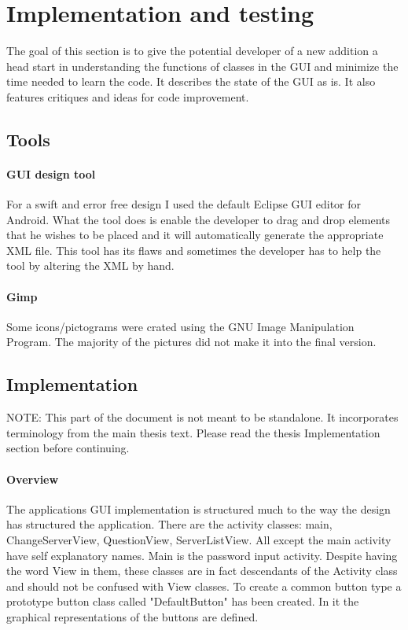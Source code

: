 \documentclass[11pt]{article} %
\begin{document}
\section{Implementation and testing}
The goal of this section is to give the potential developer of a new addition a head start in understanding the functions of classes in the GUI and minimize the time needed to learn the code. It describes the state of the GUI as is. It also features critiques and ideas for code improvement.
\subsection{Tools}
\paragraph{GUI design tool}
For a swift and error free design I used the default Eclipse GUI editor for Android. What the tool does is enable the developer to drag and drop elements that he wishes to be placed and it will automatically generate the appropriate XML file. This tool has its flaws and sometimes the developer has to help the tool by altering the XML by hand. 
\paragraph{Gimp}
Some icons/pictograms were crated using the GNU Image Manipulation Program. The majority of the pictures did not make it into the final version.
\subsection{Implementation}
NOTE: This part of the document is not meant to be standalone. It incorporates terminology from the main thesis text. Please read the thesis Implementation section before continuing.
\paragraph{Overview}
The applications GUI implementation is structured much to the way the design has structured the application. There are the activity classes: main, ChangeServerView, QuestionView, ServerListView. All except the main activity have self explanatory names. Main is the password input activity. Despite having the word View in them, these classes are in fact descendants of the Activity class and should not be confused with View classes. To create a common button type a prototype button class called "DefaultButton" has been created. In it the graphical representations of the buttons are defined.
\end{document}
